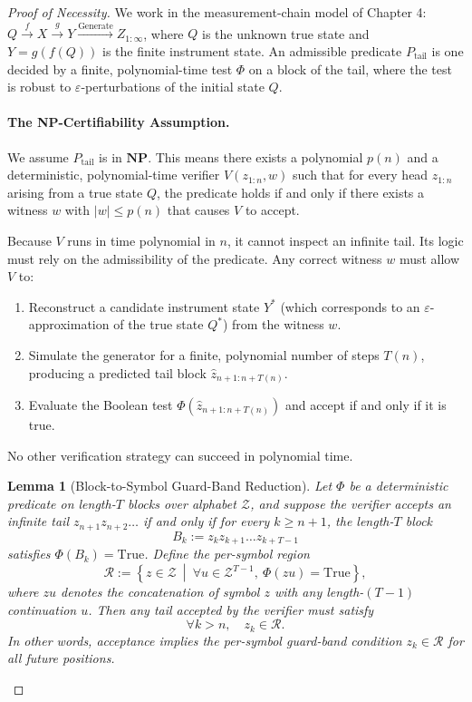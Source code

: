 \documentclass[12pt]{article}
\theoremstyle{definition}
\theoremstyle{plain}
\newtheorem{lemma}{Lemma}[section]
\begin{document}
\begin{proof}[Proof of Necessity]
We work in the measurement-chain model of Chapter 4: $Q \xrightarrow{f} X \xrightarrow{g} Y \xrightarrow{\text{Generate}} Z_{1:\infty}$, where $Q$ is the unknown true state and $Y=g(f(Q))$ is the finite instrument state. An admissible predicate $P_{\text{tail}}$ is one decided by a finite, polynomial-time test $\Phi$ on a block of the tail, where the test is robust to $\varepsilon$-perturbations of the initial state $Q$.

\paragraph{The NP-Certifiability Assumption.}
We assume $P_{\text{tail}}$ is in $\mathbf{NP}$. This means there exists a polynomial $p(n)$ and a deterministic, polynomial-time verifier $V(z_{1:n}, w)$ such that for every head $z_{1:n}$ arising from a true state $Q$, the predicate holds if and only if there exists a witness $w$ with $|w| \le p(n)$ that causes $V$ to accept.

Because $V$ runs in time polynomial in $n$, it cannot inspect an infinite tail. Its logic must rely on the admissibility of the predicate. Any correct witness $w$ must allow $V$ to:
\begin{enumerate}
    \item Reconstruct a candidate instrument state $Y^*$ (which corresponds to an $\varepsilon$-approximation of the true state $Q^*$) from the witness $w$.
    \item Simulate the generator for a finite, polynomial number of steps $T(n)$, producing a predicted tail block $\widehat{z}_{n+1:n+T(n)}$.
    \item Evaluate the Boolean test $\Phi(\widehat{z}_{n+1:n+T(n)})$ and accept if and only if it is true.
\end{enumerate}
No other verification strategy can succeed in polynomial time.

\begin{lemma}[Block-to-Symbol Guard-Band Reduction]
\label{lem:block-to-symbol-reduction}
Let $\Phi$ be a deterministic predicate on length-$T$ blocks over alphabet $\mathcal{Z}$, and suppose the verifier accepts an infinite tail $z_{n+1}z_{n+2}\dots$ if and only if for every $k\ge n+1$, the length-$T$ block 
\[
B_k := z_k z_{k+1} \dots z_{k+T-1}
\]
satisfies $\Phi(B_k)=\mathrm{True}$. Define the per-symbol region
\[
\mathcal{R} := \left\{ z\in\mathcal{Z} \ \middle|\ \forall u\in\mathcal{Z}^{T-1},\ \Phi(zu)=\mathrm{True} \right\},
\]
where $zu$ denotes the concatenation of symbol $z$ with any length-$(T-1)$ continuation $u$. Then any tail accepted by the verifier must satisfy
\[
\forall k>n,\quad z_k\in\mathcal{R}.
\]
In other words, acceptance implies the per-symbol guard-band condition $z_k\in\mathcal{R}$ for all future positions.
\end{lemma}


\end{proof}
\end{document}
